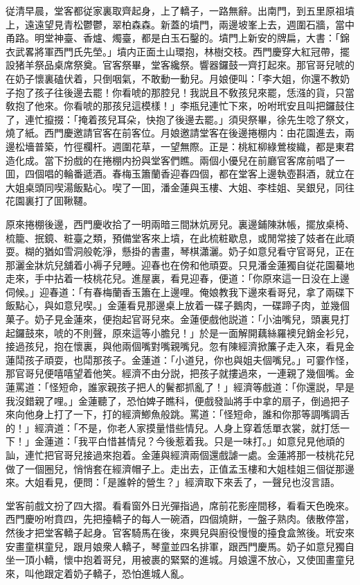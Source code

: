 従清早晨，堂客都従家裏取齊起身，上了轎子，一路無辭。出南門，到五里原祖墳上，遠遠望見青松鬱鬱，翠柏森森。新蓋的墳門，兩邊坡峯上去，週圍石牆，當中甬路。明堂神臺、香爐、燭臺，都是白玉石鑿的。墳門上新安的牌扁，大書：「錦衣武畧將軍西門氏先塋。」墳内正面土山環抱，林樹交枝。西門慶穿大紅冠帶，擺設猪羊祭品桌席祭奠。官客祭畢，堂客纔祭。響器鑼鼓一齊打起來。那官哥兒唬的在奶子懷裏磕伏着，只倒咽氣，不敢動一動兒。月娘便叫：「李大姐，你還不教奶子抱了孩子往後邊去罷！你看唬的那腔兒！我説且不敎孩兒來罷，恁漒的貨，只當敎抱了他來。你看唬的那孩兒這模樣！」李瓶兒連忙下來，吩咐玳安且叫把鑼鼓住了，連忙攛掇：「掩着孩兒耳朵，快抱了後邊去罷。」須臾祭畢，徐先生唸了祭文，燒了紙。西門慶邀請官客在前客位。月娘邀請堂客在後邊捲棚内：由花園進去，兩邊松墻普築，竹徑欄杆。週圍花草，一望無際。正是：桃紅柳綠鶯梭織，都是東君造化成。當下扮戲的在捲棚内扮與堂客們瞧。兩個小優兒在前廳官客席前唱了一囬，四個唱的輪番遞酒。春梅玉簫蘭香迎春四個，都在堂客上邊執壺斟酒，就立在大姐桌頭同喫湯飯點心。喫了一囬，潘金蓮與玉樓、大姐、李桂姐、吴銀兒，同往花園裏打了囬鞦韆。

原來捲棚後邊，西門慶收拾了一明兩暗三間牀炕房兒。裏邊鋪陳牀帳，擺放桌椅、梳籠、抿鏡、粧臺之類，預備堂客來上墳，在此梳粧歇息，或閒常接了妓者在此頑耍。糊的猶如雪洞般乾淨，懸掛的書畫，琴棋瀟灑。奶子如意兒看守官哥兒，正在那灑金牀炕兒舖着小褥子兒睡。迎春也在傍和他頑耍。只見潘金蓮獨自従花園驀地走來，手中拈着一枝桃花兒。進屋裏，看見迎春，便道：「你原來這一日没在上邊伺候。」迎春道：「有春梅蘭香玉簫在上邊哩。俺娘教我下邊來看哥兒，拿了兩碟下飯點心，與如意兒喫。」金蓮看見那邊桌上放着一碟子鵝肉，一碟蹄子肉，並幾個菓子。奶子見金蓮來，便抱起官哥兒來。金蓮便戲他説道：「小油嘴兒，頭裏見打起鑼鼓來，唬的不則聲，原來這等小膽兒！」於是一面解開藕絲羅襖兒銷金衫兒，接過孩兒，抱在懷裏，與他兩個嘴對嘴親嘴兒。忽有陳經濟掀簾子走入來，看見金蓮鬦孩子頑耍，也鬦那孩子。金蓮道：「小道兒，你也與姐夫個嘴兒。」可霎作怪，那官哥兒便嘻嘻望着他笑。經濟不由分説，把孩子就摟過來，一連親了幾個嘴。金蓮罵道：「怪短命，誰家親孩子把人的鬢都抓亂了！」經濟等戲道：「你還説，早是我沒錯親了哩。」金蓮聽了，恐怕婢子瞧科，便戲發訕將手中拿的扇子，倒過把子來向他身上打了一下，打的經濟鯽魚般跳。罵道：「怪短命，誰和你那等調嘴調舌的！」經濟道：「不是，你老人家摸量惜些情兒。人身上穿着恁單衣裳，就打恁一下！」金蓮道：「我平白惜甚情兒？今後惹着我。只是一味打。」如意兒見他頑的訕，連忙把官哥兒接過來抱着。金蓮與經濟兩個還戲謔一處。金蓮將那一枝桃花兒做了一個圈兒，悄悄套在經濟帽子上。走出去，正值孟玉樓和大姐桂姐三個従那邊來。大姐看見，便問：「是誰幹的營生？」經濟取下來丢了，一聲兒也沒言語。

堂客前戲文扮了四大摺。看看窗外日光彈指過，席前花影座間移，看看天色晚來。西門慶吩咐賁四，先把擡轎子的每人一碗酒，四個燒餅，一盤子熟肉。俵散停當，然後才把堂客轎子起身。官客騎馬在後，來興兒與廚役慢慢的擡食盒煞後。玳安來安畫童棋童兒，跟月娘衆人轎子，琴童並四名排軍，跟西門慶馬。奶子如意兒獨自坐一頂小轎，懷中抱着哥兒，用被裹的緊緊的進城。月娘還不放心，又使囬畫童兒來，叫他跟定着奶子轎子，恐怕進城人亂。


